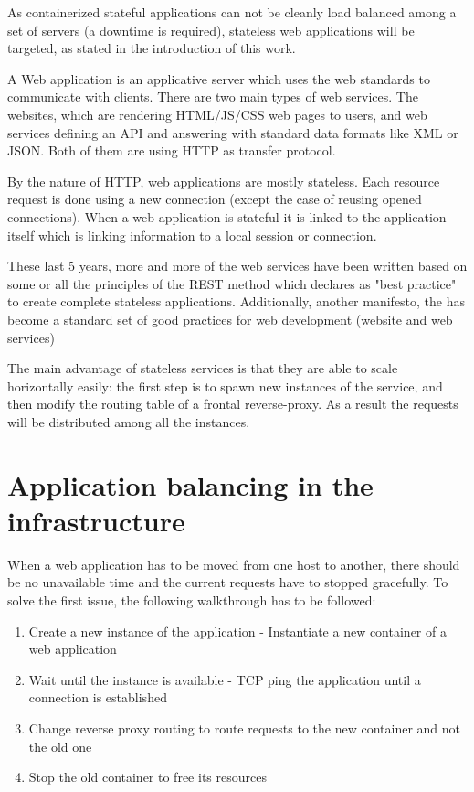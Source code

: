 As containerized stateful applications can not be cleanly load balanced among a
set of servers (a downtime is required), stateless web applications will be
targeted, as stated in the introduction of this work.

A Web application is an applicative server which uses the web standards to
communicate with clients. There are two main types of web services. The
websites, which are rendering HTML/JS/CSS web pages to users, and web services
defining an API and answering with standard data formats like XML or JSON. Both
of them are using HTTP as transfer protocol.

By the nature of HTTP, web applications are mostly stateless. Each resource
request is done using a new connection (except the case of reusing opened
connections). When a web application is stateful it is linked to the
application itself which is linking information to a local session or
connection.

These last 5 years, more and more of the web services have been written based
on some or all the principles of the REST method which declares as "best
practice" to create complete stateless applications. Additionally, another
manifesto, the \cite{website12Factors} has become a standard set of good
practices for web development (website and web services)

The main advantage of stateless services is that they are able to scale
horizontally easily: the first step is to spawn new instances of the service,
and then modify the routing table of a frontal reverse-proxy. As a result the
requests will be distributed among all the instances.

\section{Application balancing in the infrastructure}

When a web application has to be moved from one host to another, there should
be no unavailable time and the current requests have to stopped gracefully. To
solve the first issue, the following walkthrough has to be followed:

\begin{enumerate}
	\item{Create a new instance of the application - Instantiate a new
	container of a web application}
	\item{Wait until the instance is available - TCP ping the application
	until a connection is established}
	\item{Change reverse proxy routing to route requests to the new
	container and not the old one}
	\item{Stop the old container to free its resources}
\end{enumerate}

